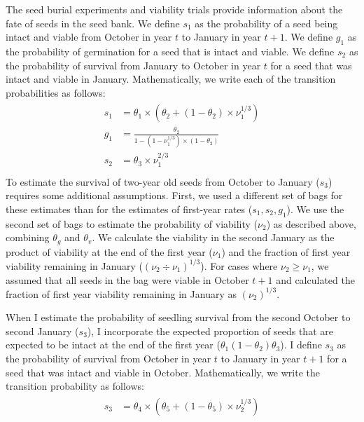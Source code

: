 \documentclass[12pt, oneside, titlepage]{article}   	%
\begin{document}
The seed burial experiments and viability trials provide information about the fate of seeds in the seed bank. We define $s_1$ as the probability of a seed being intact and viable from October in year $t$ to January in year $t+1$. We define $g_1$ as the probability of germination for a seed that is intact and viable. We define $s_2$ as the probability of survival from January to October in year $t$ for a seed that was intact and viable in January.  Mathematically, we write each of the transition probabilities as follows:
%
    \begin{align}
\begin{split}
s_1 & = \theta_1 \times (\theta_2 + ( 1- \theta_2 ) \times \nu_1^{1/3} ) \\
g_1 & = \frac{\theta_2 }{1 - ( 1-  \nu_1^{1/3} ) \times ( 1 - \theta_2 )} \\
s_2 & = \theta_3 \times \nu_1^{2/3} \\
  \end{split}
\end{align}
%
To estimate the survival of two-year old seeds from October to January ($s_3$) requires some additional assumptions. First, we used a different set of bags for these estimates than for the estimates of first-year rates ($s_1, s_2, g_1$). We use the second set of bags to estimate the probability of viability ($\nu_2$) as described above, combining $\theta_g$ and $\theta_v$. We calculate the viability in the second January as the product of viability at the end of the first year ($\nu_1$) and the fraction of first year viability remaining in January ($ (\nu_2 \div \nu_1)^{1/3} $). For cases where $\nu_2 \geq \nu_1$, we assumed that all seeds in the bag were viable in October $t+1$ and calculated the fraction of first year viability remaining in January as $ (\nu_2 )^{1/3} $.

When I estimate the probability of seedling survival from the second October to second January ($s_3$), I incorporate the expected proportion of seeds that are expected to be intact at the end of the first year ($\theta_1(1-\theta_2) \theta_3$). I define $s_3$ as the probability of survival from October in year $t$ to January in year $t+1$ for a seed that was intact and viable in October. Mathematically, we write the transition probability as follows:
%
    \begin{align}
\begin{split}
s_3 & = \theta_4 \times (\theta_5 + ( 1- \theta_5 ) \times \nu_2^{1/3} )
  \end{split}
\end{align}
%
\end{document}
